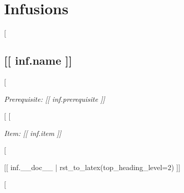\section*{Infusions}
[%
  \subsection*{[[ inf.name ]]}

  [%

		\noindent
    \textit{Prerequisite: [[ inf.prerequisite ]]}%

  [%
  [%

    \noindent
    \textit{Item: [[ inf.item ]]}%

  [%

  [[ inf.__doc__ | rst_to_latex(top_heading_level=2) ]]

[%
